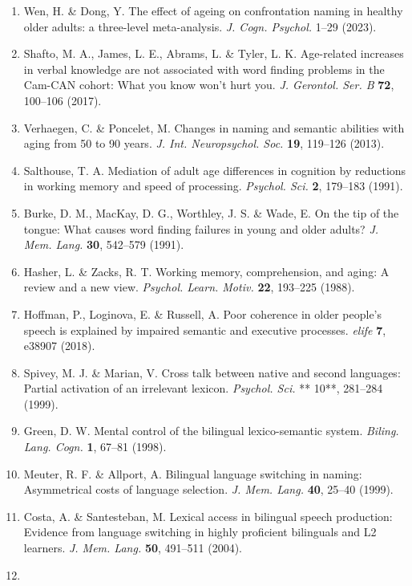\documentclass[
]{article}
\providecommand{\tightlist}{%
  \setlength{\itemsep}{0pt}\setlength{\parskip}{0pt}}
\begin{document}
\begin{enumerate}
\def\labelenumi{\arabic{enumi}.}
\tightlist
\item
  Wen, H. \& Dong, Y. The effect of ageing on confrontation naming in healthy older adults: a three-level meta-analysis. \emph{J. Cogn. Psychol.} 1--29 (2023).
\item
  Shafto, M. A., James, L. E., Abrams, L. \& Tyler, L. K. Age-related increases in verbal knowledge are not associated with word finding problems in the Cam-CAN cohort: What you know won't hurt you. \emph{J. Gerontol. Ser. B} \textbf{72}, 100--106 (2017).
\item
  Verhaegen, C. \& Poncelet, M. Changes in naming and semantic abilities with aging from 50 to 90 years. \emph{J. Int. Neuropsychol. Soc.} \textbf{19}, 119--126 (2013).
\item
  Salthouse, T. A. Mediation of adult age differences in cognition by reductions in working memory and speed of processing. \emph{Psychol. Sci.} \textbf{2}, 179--183 (1991).
\item
  Burke, D. M., MacKay, D. G., Worthley, J. S. \& Wade, E. On the tip of the tongue: What causes word finding failures in young and older adults? \emph{J. Mem. Lang.} \textbf{30}, 542--579 (1991).
\item
  Hasher, L. \& Zacks, R. T. Working memory, comprehension, and aging: A review and a new view. \emph{Psychol. Learn. Motiv.} \textbf{22}, 193--225 (1988).
\item
  Hoffman, P., Loginova, E. \& Russell, A. Poor coherence in older people's speech is explained by impaired semantic and executive processes. \emph{elife} \textbf{7}, e38907 (2018).
\item
  Spivey, M. J. \& Marian, V. Cross talk between native and second languages: Partial activation of an irrelevant lexicon. \emph{Psychol. Sci.} ** 10**, 281--284 (1999).
\item
  Green, D. W. Mental control of the bilingual lexico-semantic system. \emph{Biling. Lang. Cogn.} \textbf{1}, 67--81 (1998).
\item
  Meuter, R. F. \& Allport, A. Bilingual language switching in naming: Asymmetrical costs of language selection. \emph{J. Mem. Lang.} \textbf{40}, 25--40 (1999).
\item
  Costa, A. \& Santesteban, M. Lexical access in bilingual speech production: Evidence from language switching in highly proficient bilinguals and L2 learners. \emph{J. Mem. Lang.} \textbf{50}, 491--511 (2004).
\item

\end{enumerate}
\end{document}
